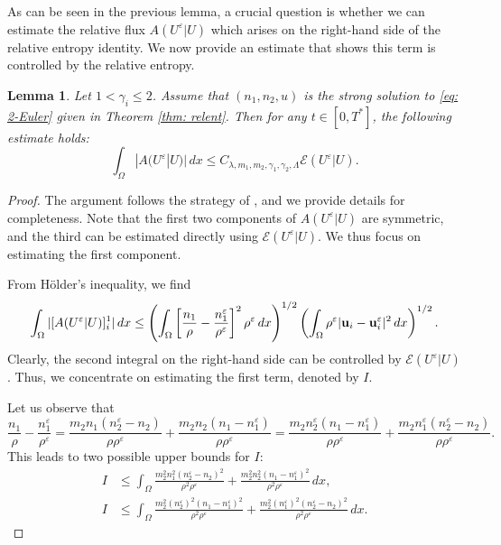 \documentclass[10pt,reqno]{amsart}
\numberwithin{equation}{section}
\newtheorem{lemma}{Lemma}[section]
\newcommand{\calE}{\mathcal E}
\newcommand{\ve}{\varepsilon}
\begin{document}
 


As can be seen in the previous lemma, a crucial question is whether we can estimate the relative flux $A(U^\ve|U)$ which arises on the right-hand side of the relative entropy identity. We now provide an estimate that shows this term is controlled by the relative entropy.

\begin{lemma}\label{lem: flux}
Let $1< \gamma_i \leq 2$.    Assume that $(n_1,n_2,u)$ is the strong solution to \eqref{eq: 2-Euler} given in Theorem \ref{thm: relent}. Then for any $t \in [0,T^*]$, the following estimate holds:
\[
        \int_\Omega |A(U^\ve|U)|\,dx \le C_{\lambda,m_1,m_2,\gamma_1,\gamma_2,\Lambda} \calE(U^\ve|U).
\]
\end{lemma}
\begin{proof}
The argument follows the strategy of \cite{MV08}, and we provide details for completeness. Note that the first two components of $A(U^\ve|U)$ are symmetric, and the third can be estimated directly using $\mathcal{E}(U^\ve|U)$. We thus focus on estimating the first component.
 
 From H\"older's inequality, we find
\[
 \int_\Omega |[A(U^\ve|U)]^1_i|\,dx   \le \left(\int_\Omega \left[\frac{n_1}{\rho} - \frac{n_1^\ve}{\rho^\ve} \right]^2 \rho^\ve\,dx \right)^{1/2} \left(\int_\Omega \rho^\ve |{\bf{u}}_i - {\bf{u}}_i^\ve|^2\,dx\right)^{1/2}.
\]
    Clearly, the second integral on the right-hand side can be controlled by $\calE(U^\ve|U)$. Thus, we concentrate on estimating the first term, denoted by $I$.
    
    Let us observe that
\[
        \frac{n_1}{\rho} - \frac{n_1^\ve}{\rho^\ve}  
         = \frac{m_{2} n_1 (n_{2}^\ve - n_{2}) }{\rho \rho^\ve } + \frac{m_{2} n_{2} (n_1 - n_1^\ve) }{\rho \rho^\ve}  = \frac{m_2n_2^\ve (n_1 - n_1^\ve)}{\rho \rho^\ve} + \frac{m_2 n_1^\ve (n_2^\ve - n_2) }{\rho \rho^\ve}. 
\]
This leads to two possible upper bounds for $I$:
    \begin{align}
        I &\le \int_\Omega \frac{m_2^2n_1^2(n_2^\ve-n_2)^2}{\rho^2 \rho^\ve} + \frac{m_2^2 n_2^2 (n_1-n_1^\ve)^2}{\rho^2\rho^\ve}\,dx, \label{eq: diff1} \\
        I &\le \int_\Omega \frac{m_2^2 (n_2^\ve)^2 (n_1-n_1^\ve)^2}{\rho^2 \rho^\ve} + \frac{m_2^2(n_1^\ve)^2 (n_2^\ve-n_2)^2}{\rho^2 \rho^\ve}\,dx. \label{eq: diff2}
    \end{align}
    

\end{proof}
\end{document}
